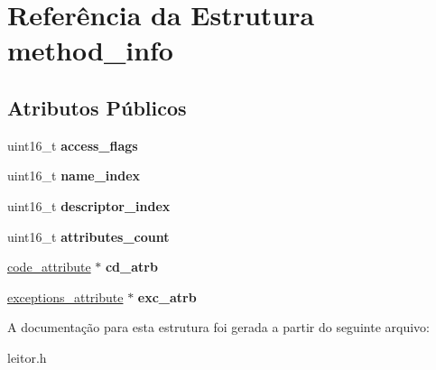 \hypertarget{structmethod__info}{\section{Referência da Estrutura method\-\_\-info}
\label{structmethod__info}
}
\subsection*{Atributos Públicos}
\begin{DoxyCompactItemize}
\item 
\hypertarget{structmethod__info_a8fc68aba419f2617deda879c467f5410}{uint16\-\_\-t {\bfseries access\-\_\-flags}}\label{structmethod__info_a8fc68aba419f2617deda879c467f5410}

\item 
\hypertarget{structmethod__info_af0ba3d6d566432e74eed5c37cd998c14}{uint16\-\_\-t {\bfseries name\-\_\-index}}\label{structmethod__info_af0ba3d6d566432e74eed5c37cd998c14}

\item 
\hypertarget{structmethod__info_abccd6a5202d4c0ee1be6b89692d0352a}{uint16\-\_\-t {\bfseries descriptor\-\_\-index}}\label{structmethod__info_abccd6a5202d4c0ee1be6b89692d0352a}

\item 
\hypertarget{structmethod__info_a9e711e4dfb8181f7dce16c6f640ba734}{uint16\-\_\-t {\bfseries attributes\-\_\-count}}\label{structmethod__info_a9e711e4dfb8181f7dce16c6f640ba734}

\item 
\hypertarget{structmethod__info_a2df83a6afd744e81b636f36253933f71}{\hyperlink{structcode__attribute}{code\-\_\-attribute} $\ast$ {\bfseries cd\-\_\-atrb}}\label{structmethod__info_a2df83a6afd744e81b636f36253933f71}

\item 
\hypertarget{structmethod__info_a8f71b90d5c7b54201f732dfdbf1a0971}{\hyperlink{structexceptions__attribute}{exceptions\-\_\-attribute} $\ast$ {\bfseries exc\-\_\-atrb}}\label{structmethod__info_a8f71b90d5c7b54201f732dfdbf1a0971}

\end{DoxyCompactItemize}


A documentação para esta estrutura foi gerada a partir do seguinte arquivo\-:\begin{DoxyCompactItemize}
\item 
leitor.\-h\end{DoxyCompactItemize}

